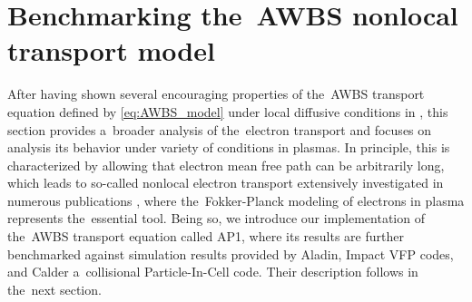 \section{Benchmarking the~AWBS nonlocal transport model}
\label{sec:BenchmarkingAWBS}
After having shown several encouraging properties of the~AWBS transport 
equation defined by \eqref{eq:AWBS_model} under local diffusive conditions
in , this section provides a~broader analysis
of the~electron transport and focuses on analysis its behavior under variety of
conditions in plasmas. In principle, this is characterized by allowing that
electron mean free path can be arbitrarily long, which leads to so-called 
nonlocal electron transport extensively investigated in numerous publications 
\cite{Malone_1975_15, Colombant_PoP2005, Bell_1981_83, LMV_1983_7, Brantov_Nonlocal_electron_transport_1998, schurtz2000, Sorbo_2015}, where the~Fokker-Planck
modeling of electrons in plasma represents the~essential tool. Being so, 
we introduce our implementation of the~AWBS transport equation called AP1,
where its results are further benchmarked against simulation results
provided by Aladin, Impact VFP codes, and Calder a~collisional Particle-In-Cell
code. Their description follows in the~next section.

